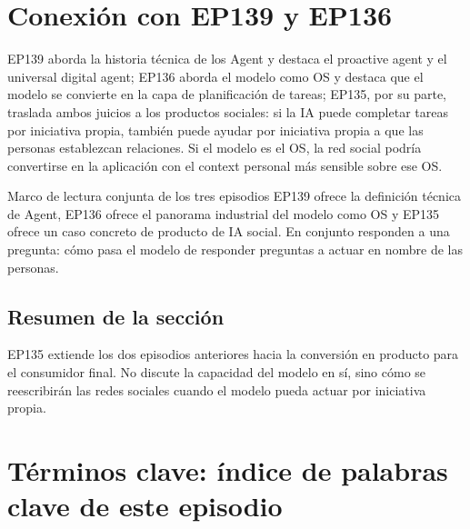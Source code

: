 \documentclass[a4paper]{article}
\begin{document}
\section{Conexión con EP139 y EP136}

EP139 aborda la historia técnica de los Agent y destaca el proactive agent y el universal digital agent; EP136 aborda el modelo como OS y destaca que el modelo se convierte en la capa de planificación de tareas; EP135, por su parte, traslada ambos juicios a los productos sociales: si la IA puede completar tareas por iniciativa propia, también puede ayudar por iniciativa propia a que las personas establezcan relaciones. Si el modelo es el OS, la red social podría convertirse en la aplicación con el context personal más sensible sobre ese OS.

\begin{knowledgebox}{Marco de lectura conjunta de los tres episodios}
EP139 ofrece la definición técnica de Agent, EP136 ofrece el panorama industrial del modelo como OS y EP135 ofrece un caso concreto de producto de IA social. En conjunto responden a una pregunta: cómo pasa el modelo de responder preguntas a actuar en nombre de las personas.
\end{knowledgebox}

\subsection{Resumen de la sección}

EP135 extiende los dos episodios anteriores hacia la conversión en producto para el consumidor final. No discute la capacidad del modelo en sí, sino cómo se reescribirán las redes sociales cuando el modelo pueda actuar por iniciativa propia.
\section{Términos clave: índice de palabras clave de este episodio}
\end{document}
